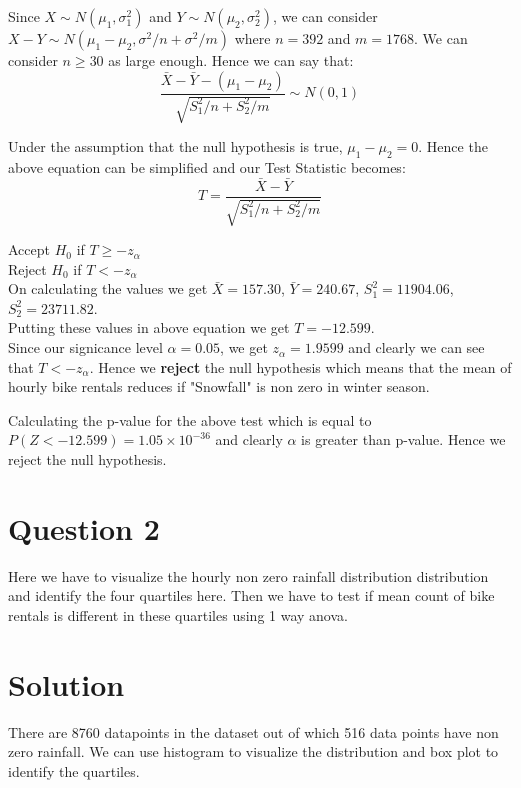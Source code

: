 \documentclass[12pt, letterpaper]{article}
\begin{document}
Since $X \sim N(\mu_1,\sigma_1^2)$ and $Y \sim N(\mu_2,\sigma_2^2)$, we can consider $X-Y \sim N(\mu_1-\mu_2,\sigma^2/n + \sigma^2/m)$ where $n=392$ and $m=1768$. We can consider $n \geq 30$ as large enough. Hence we can say that: \\


    \[ \boxed{\frac{\bar{X} - \bar{Y} - (\mu_1 - \mu_2)}{\sqrt{S_1^2/n + S_2^2/m}} \sim N(0,1)} \]

Under the assumption that the null hypothesis is true, $\mu_1 - \mu_2 = 0$. Hence the above equation can be simplified and our Test Statistic becomes: \\

\[ \boxed{T = \frac{\bar{X} - \bar{Y}}{\sqrt{S_1^2/n + S_2^2/m}} } \]

Accept $H_0$ if $T \geq -z_{\alpha}$ \\
Reject $H_0$ if $T < -z_{\alpha}$ \\

On calculating the values we get $\bar{X} = 157.30$, $\bar{Y} = 240.67$, $S_1^2 = 11904.06$, $S_2^2 = 23711.82$. \\

Putting these values in above equation we get $T=-12.599$. \\
Since our signicance level $\alpha = 0.05$, we get $z_{\alpha} = 1.9599$ and clearly we can see that $T < -z_{\alpha}$. Hence we \textbf{reject} the null hypothesis which means that the mean of hourly bike rentals reduces if "Snowfall" is non zero in winter season.

Calculating the p-value for the above test which is equal to $P(Z < -12.599) = 1.05 \times 10^{-36}$ and clearly $\alpha$ is greater than p-value. Hence we reject the null hypothesis.

\section*{Question 2}
Here we have to visualize the hourly non zero rainfall distribution distribution and identify the four quartiles here. Then we have to test if mean count of bike rentals is different in these quartiles using 1 way anova.

\section*{Solution}
There are 8760 datapoints in the dataset out of which 516 data points have non zero rainfall. We can use histogram to visualize the distribution and box plot to identify the quartiles. \\
\end{document}
